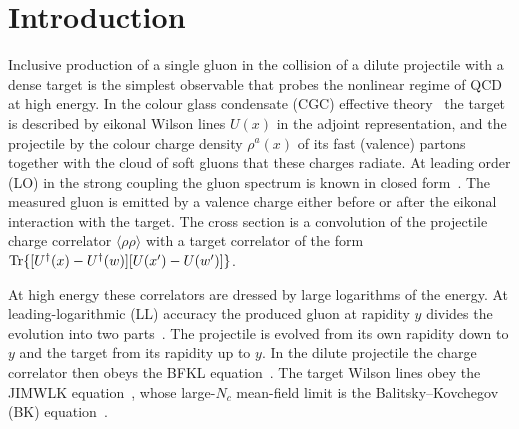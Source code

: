 \section{Introduction}\label{sec:intro}

Inclusive production of a single gluon in the collision of a dilute projectile with a dense target is the simplest observable that probes the nonlinear regime of QCD at high energy. In the colour glass condensate (CGC) effective theory~\cite{McLerran:1993ni,McLerran:1993ka} the target is described by eikonal Wilson lines $U(x)$ in the adjoint representation, and the projectile by the colour charge density $\rho^a(x)$ of its fast (valence) partons together with the cloud of soft gluons that these charges radiate. At leading order (LO) in the strong coupling the gluon spectrum is known in closed form~\cite{Kovchegov:1998bi,Kovchegov:2001sc,Dumitru:2001ux,Blaizot:2004wu,Kovner:2006wr}. The measured gluon is emitted by a valence charge either before or after the eikonal interaction with the target. The cross section is a convolution of the projectile charge correlator $\langle\rho\rho\rangle$ with a target correlator of the form $\mathrm{Tr}\{[U^{\dagger}(x)-U^{\dagger}(w)][U(x')-U(w')]\}$.

At high energy these correlators are dressed by large logarithms of the energy. At leading-logarithmic (LL) accuracy the produced gluon at rapidity $y$ divides the evolution into two parts~\cite{Kovchegov:2001sc,Baier:2005dv,Kovner:2006ge,Kovner:2006wr,Gelis:2008rw}. The projectile is evolved from its own rapidity down to $y$ and the target from its rapidity up to $y$. In the dilute projectile the charge correlator then obeys the BFKL equation~\cite{Kuraev:1977fs,Balitsky:1978ic}. The target Wilson lines obey the JIMWLK equation~\cite{JalilianMarian:1997jx,JalilianMarian:1997gr,JalilianMarian:1998cb,Kovner:2000pt,Weigert:2000gi,Iancu:2000hn,Ferreiro:2001qy}, whose large-$N_c$ mean-field limit is the Balitsky--Kovchegov (BK) equation~\cite{Balitsky:1995ub,Kovchegov:1999yj}.

